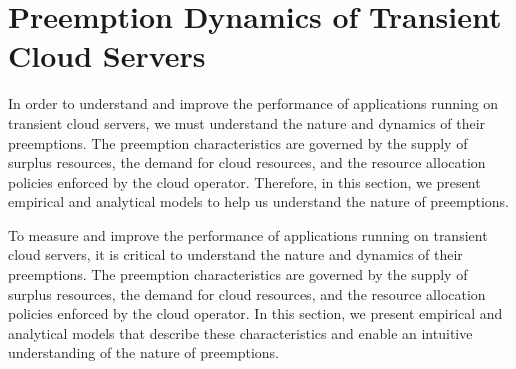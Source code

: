 \section{Preemption Dynamics of Transient Cloud Servers}


In order to understand and improve the performance of applications running on transient cloud servers, we must understand the nature and dynamics of their preemptions.
The preemption characteristics are governed by the supply of surplus resources, the demand for cloud resources, and the resource allocation policies enforced by the cloud operator.
Therefore, in this section, we present empirical and analytical models to help us understand the nature of preemptions. 

\vikram
{
To measure and improve the performance of applications running on transient cloud servers, it is critical to understand the nature and dynamics of their preemptions.
The preemption characteristics are governed by the supply of surplus resources, the demand for cloud resources, and the resource allocation policies enforced by the cloud operator.
In this section, we present empirical and analytical models that describe these characteristics and enable an intuitive understanding of the nature of preemptions. 
}







